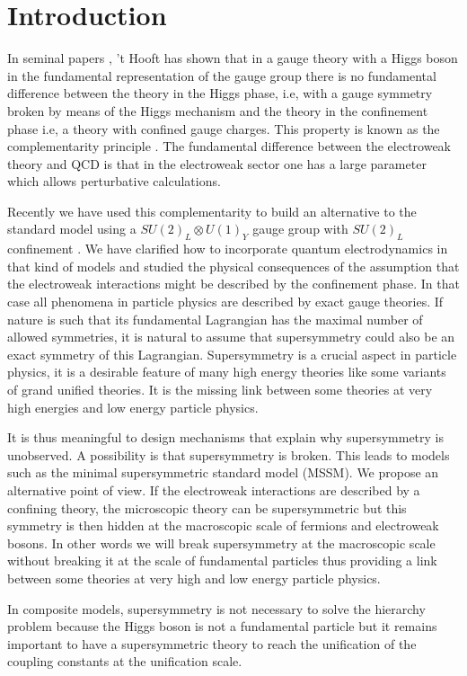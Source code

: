 \documentclass[a4paper,12pt]{article}
\begin{document}
\section{Introduction}
In seminal papers \cite{tHooft1,tHooft2}, 't Hooft has shown that in a
gauge theory with a Higgs boson in the fundamental representation of
the gauge group there is no fundamental difference between the theory
in the Higgs phase, i.e, with a gauge symmetry broken by means of the
Higgs mechanism and the theory in the confinement phase i.e, a theory
with confined gauge charges. This property is known as the
complementarity principle \cite{Osterwalder:1978pc}. The fundamental
difference between the electroweak theory and QCD is that in the
electroweak sector one has a large parameter which allows perturbative
calculations.

Recently we have used this complementarity to build an alternative to
the standard model using a $SU(2)_L \otimes U(1)_Y$ gauge group with
$SU(2)_L$ confinement \cite{CF}.  We have clarified how to incorporate
quantum electrodynamics in that kind of models and studied the
physical consequences of the assumption that the electroweak
interactions might be described by the confinement phase.  In that
case all phenomena in particle physics are described by exact gauge
theories. If nature is such that its fundamental Lagrangian has the
maximal number of allowed symmetries, it is natural to assume that
supersymmetry could also be an exact symmetry of this Lagrangian.
Supersymmetry is a crucial aspect in particle physics, it is a
desirable feature of many high energy theories like some variants of
grand unified theories. It is the missing link between some theories
at very high energies and low energy particle physics.


It is thus meaningful to design mechanisms that explain why
supersymmetry is unobserved. A possibility is that supersymmetry is
broken. This leads to models such as the minimal supersymmetric
standard model (MSSM). We propose an alternative point of view. If the
electroweak interactions are described by a confining theory, the
microscopic theory can be supersymmetric but this symmetry is then
hidden at the macroscopic scale of fermions and electroweak bosons.
In other words we will break supersymmetry at the macroscopic scale
without breaking it at the scale of fundamental particles thus
providing a link between some theories at very high and low energy
particle physics.

In composite models, supersymmetry is not necessary to solve the
hierarchy problem because the Higgs boson is not a fundamental
particle but it remains important to have a supersymmetric theory to
reach the unification of the coupling constants at the unification
scale.
\end{document}

